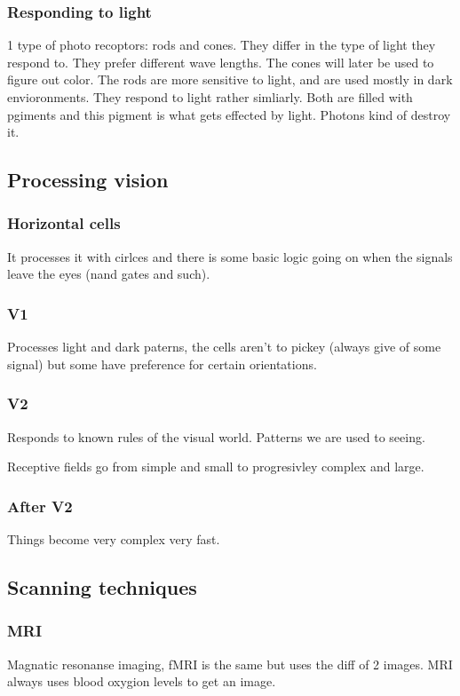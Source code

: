 \documentclass{article}
\begin{document}
\subsubsection{Responding to light}
1 type of photo recoptors: rods and cones. They differ in the type of light
they respond to. They prefer different wave lengths. The cones will later
be used to figure out color. The rods are more sensitive to light, and
are used mostly in dark envioronments. They respond to light rather simliarly.
Both are filled with pgiments and this pigment is what gets effected by light.
Photons kind of destroy it.

\subsection{Processing vision}
\subsubsection{Horizontal cells}
It processes it with cirlces and there is some basic logic
going on when the signals leave the eyes (nand gates and such).

\subsubsection{V1}
Processes light and dark paterns, the cells aren't to pickey (always give
of some signal) but some have preference for certain orientations.

\subsubsection{V2}
Responds to known rules of the visual world. Patterns we are used to seeing.

Receptive fields go from simple and small to progresivley complex and large.

\subsubsection{After V2}
Things become very complex very fast.

\subsection{Scanning techniques}

\subsubsection{MRI}
Magnatic resonanse imaging, fMRI is the same but uses
the diff of 2 images. MRI always uses blood oxygion
levels to get an image.
\end{document}
